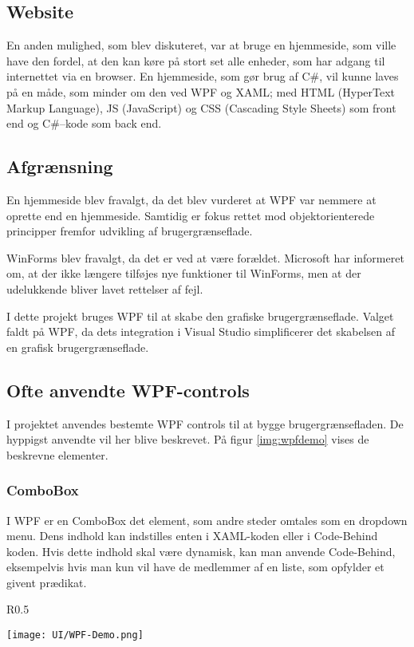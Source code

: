 \subsection{Website}
En anden mulighed, som blev diskuteret, var at bruge en hjemmeside, som ville have den fordel, at den kan køre på stort set alle enheder, som har adgang til internettet via en browser. 
En hjemmeside, som gør brug af C\#, vil kunne laves på en måde, som minder om den ved WPF og XAML; med HTML (HyperText Markup Language), JS (JavaScript) og CSS (Cascading Style Sheets) som front end og C\#--kode som back end. 

\subsection{Afgrænsning}
En hjemmeside blev fravalgt, da det blev vurderet at WPF var nemmere at oprette end en hjemmeside.
Samtidig er fokus rettet mod objektorienterede principper fremfor udvikling af brugergrænseflade.

WinForms blev fravalgt, da det er ved at være forældet.
Microsoft har informeret om, at der ikke længere tilføjes nye funktioner til WinForms, men at der udelukkende bliver lavet rettelser af fejl.\citep{winforms}

I dette projekt bruges \ac{WPF} til at skabe den grafiske brugergrænseflade. 
Valget faldt på \ac{WPF}, da dets integration i Visual Studio simplificerer det skabelsen af en grafisk brugergrænseflade.


\subsection{Ofte anvendte WPF-controls}
I projektet anvendes bestemte WPF controls til at bygge brugergrænsefladen. 
De hyppigst anvendte vil her blive beskrevet. 
På figur \ref{img:wpfdemo} vises de beskrevne elementer.

\subsubsection*{ComboBox}
I WPF er en ComboBox det element, som andre steder omtales som en dropdown menu. 
Dens indhold kan indstilles enten i XAML-koden eller i Code-Behind koden.
Hvis dette indhold skal være dynamisk, kan man anvende Code-Behind, eksempelvis hvis man kun vil have de medlemmer af en liste, som opfylder et givent prædikat.

\begin{wrapfigure}[15]{R}{0.5\textwidth}
    \label{img:wpfdemo}
    \vspace{-30pt}
    \begin{center}
        \texttt{[image: UI/WPF-Demo.png]}
    \end{center}
    \vspace{-15pt}
    \caption{Demonstration af WPFs Controls (Note: De 3 sidste elementer er henholdsvis DataGrid, ComboBox og ListBox)}
    \vspace{-15pt}
\end{wrapfigure}

